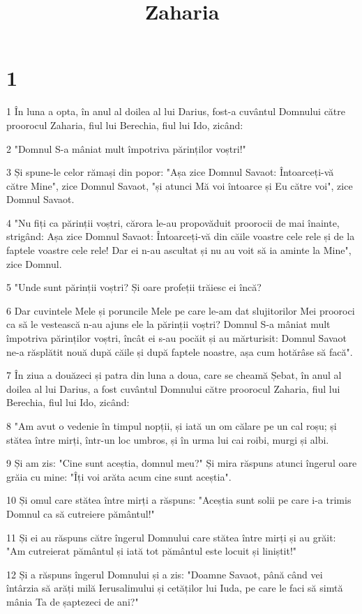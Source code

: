 

\title{Zaharia}


\chapter{1}

\par 1 În luna a opta, în anul al doilea al lui Darius, fost-a cuvântul Domnului către proorocul Zaharia, fiul lui Berechia, fiul lui Ido, zicând:
\par 2 "Domnul S-a mâniat mult împotriva părinților voștri!"
\par 3 Și spune-le celor rămași din popor: "Așa zice Domnul Savaot: Întoarceți-vă către Mine", zice Domnul Savaot, "și atunci Mă voi întoarce și Eu către voi", zice Domnul Savaot.
\par 4 "Nu fiți ca părinții voștri, cărora le-au propovăduit proorocii de mai înainte, strigând: Așa zice Domnul Savaot: Întoarceți-vă din căile voastre cele rele și de la faptele voastre cele rele! Dar ei n-au ascultat și nu au voit să ia aminte la Mine", zice Domnul.
\par 5 "Unde sunt părinții voștri? Și oare profeții trăiesc ei încă?
\par 6 Dar cuvintele Mele și poruncile Mele pe care le-am dat slujitorilor Mei prooroci ca să le vestească n-au ajuns ele la părinții voștri? Domnul S-a mâniat mult împotriva părinților voștri, încât ei s-au pocăit și au mărturisit: Domnul Savaot ne-a răsplătit nouă după căile și după faptele noastre, așa cum hotărâse să facă".
\par 7 În ziua a douăzeci și patra din luna a doua, care se cheamă Șebat, în anul al doilea al lui Darius, a fost cuvântul Domnului către proorocul Zaharia, fiul lui Berechia, fiul lui Ido, zicând:
\par 8 "Am avut o vedenie în timpul nopții, și iată un om călare pe un cal roșu; și stătea între mirți, într-un loc umbros, și în urma lui cai roibi, murgi și albi.
\par 9 Și am zis: "Cine sunt aceștia, domnul meu?" Și mira răspuns atunci îngerul oare grăia cu mine: "Îți voi arăta acum cine sunt aceștia".
\par 10 Și omul care stătea între mirți a răspuns: "Aceștia sunt solii pe care i-a trimis Domnul ca să cutreiere pământul!"
\par 11 Și ei au răspuns către îngerul Domnului care stătea între mirți și au grăit: "Am cutreierat pământul și iată tot pământul este locuit și liniștit!"
\par 12 Și a răspuns îngerul Domnului și a zis: "Doamne Savaot, până când vei întârzia să arăți milă Ierusalimului și cetăților lui Iuda, pe care le faci să simtă mânia Ta de șaptezeci de ani?"
